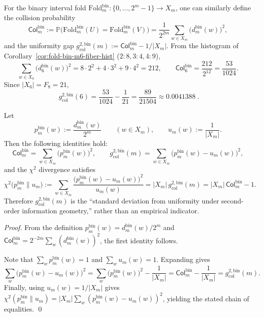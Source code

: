 \begin{remark}[Numerical anchor for the uniformity gap at \texorpdfstring{$m=6$}{m=6} (bin-fold)]\label{rem:fold-bin-m6-col-gap}
For the binary interval fold \(\mathrm{Fold}^{\mathrm{bin}}_m:\{0,\dots,2^m-1\}\to X_m\), one can similarly define the collision probability
\[
\mathsf{Col}^{\mathrm{bin}}_m:=\mathbb{P}\bigl(\mathrm{Fold}^{\mathrm{bin}}_m(U)=\mathrm{Fold}^{\mathrm{bin}}_m(V)\bigr)
=\frac{1}{2^{2m}}\sum_{w\in X_m}\bigl(d^{\mathrm{bin}}_m(w)\bigr)^2,
\]
and the uniformity gap
\(
g_{\mathrm{col}}^{2,\mathrm{bin}}(m):=\mathsf{Col}^{\mathrm{bin}}_m-1/|X_m|
\).
From the histogram of Corollary~\ref{cor:fold-bin-m6-fiber-hist} (\(2:8,3:4,4:9\)),
\[
\sum_{w\in X_6}\bigl(d^{\mathrm{bin}}_6(w)\bigr)^2
=8\cdot 2^2+4\cdot 3^2+9\cdot 4^2
=212,
\qquad
\mathsf{Col}^{\mathrm{bin}}_6=\frac{212}{2^{12}}=\frac{53}{1024}.
\]
Since \(|X_6|=F_8=21\),
\[
\boxed{\;
g_{\mathrm{col}}^{2,\mathrm{bin}}(6)=\frac{53}{1024}-\frac{1}{21}
=\frac{89}{21504}\approx 0.0041388\; }.
\]
\end{remark}

\begin{proposition}\label{prop:fold-bin-chi2-col}
Let
\[
p^{\mathrm{bin}}_m(w):=\frac{d^{\mathrm{bin}}_m(w)}{2^m}\qquad (w\in X_m),
\qquad
u_m(w):=\frac{1}{|X_m|}.
\]
Then the following identities hold:
\[
\mathsf{Col}^{\mathrm{bin}}_m=\sum_{w\in X_m}\bigl(p^{\mathrm{bin}}_m(w)\bigr)^2,
\qquad
g_{\mathrm{col}}^{2,\mathrm{bin}}(m)=\sum_{w\in X_m}\bigl(p^{\mathrm{bin}}_m(w)-u_m(w)\bigr)^2,
\]
and the \(\chi^2\) divergence satisfies
\[
\chi^2\!\bigl(p^{\mathrm{bin}}_m\|u_m\bigr)
:=\sum_{w\in X_m}\frac{\bigl(p^{\mathrm{bin}}_m(w)-u_m(w)\bigr)^2}{u_m(w)}
=|X_m|\,g_{\mathrm{col}}^{2,\mathrm{bin}}(m)
=|X_m|\,\mathsf{Col}^{\mathrm{bin}}_m-1.
\]
Therefore \(g_{\mathrm{col}}^{2,\mathrm{bin}}(m)\) is the ``standard deviation from uniformity under second-order information geometry,'' rather than an empirical indicator.
\end{proposition}
\begin{proof}
From the definition \(p^{\mathrm{bin}}_m(w)=d^{\mathrm{bin}}_m(w)/2^m\) and
\(
\mathsf{Col}^{\mathrm{bin}}_m
=2^{-2m}\sum_{w}(d^{\mathrm{bin}}_m(w))^2
\),
the first identity follows.
\par
Note that \(\sum_w p^{\mathrm{bin}}_m(w)=1\) and \(\sum_w u_m(w)=1\). Expanding gives
\[
\sum_w\bigl(p^{\mathrm{bin}}_m(w)-u_m(w)\bigr)^2
=\sum_w \bigl(p^{\mathrm{bin}}_m(w)\bigr)^2-\frac{1}{|X_m|}
=\mathsf{Col}^{\mathrm{bin}}_m-\frac{1}{|X_m|}
=g_{\mathrm{col}}^{2,\mathrm{bin}}(m).
\]
Finally, using \(u_m(w)=1/|X_m|\) gives
\(
\chi^2(p^{\mathrm{bin}}_m\|u_m)=|X_m|\sum_w(p^{\mathrm{bin}}_m(w)-u_m(w))^2
\),
yielding the stated chain of equalities. \qed
\end{proof}


